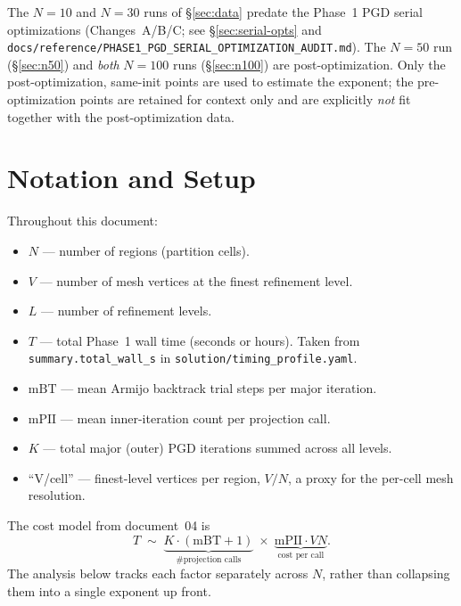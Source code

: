 \documentclass[11pt,a4paper]{article}
\begin{document}
\begin{remark}
The $N=10$ and $N=30$ runs of \S\ref{sec:data} predate the Phase~1 PGD serial
optimizations (Changes~A/B/C; see \S\ref{sec:serial-opts} and
\texttt{docs/reference/PHASE1\_PGD\_SERIAL\_OPTIMIZATION\_AUDIT.md}).  The
$N=50$ run (\S\ref{sec:n50}) and \emph{both} $N=100$ runs (\S\ref{sec:n100})
are post-optimization.  Only the post-optimization, same-init points are used
to estimate the exponent; the pre-optimization points are retained for context
only and are explicitly \emph{not} fit together with the post-optimization
data.
\end{remark}

\section{Notation and Setup}
\label{sec:notation}

Throughout this document:

\begin{itemize}
  \item $N$ --- number of regions (partition cells).
  \item $V$ --- number of mesh vertices at the finest refinement level.
  \item $L$ --- number of refinement levels.
  \item $T$ --- total Phase~1 wall time (seconds or hours).  Taken from
    \texttt{summary.total\_wall\_s} in \texttt{solution/timing\_profile.yaml}.
  \item $\mathrm{mBT}$ --- mean Armijo backtrack trial steps per major iteration.
  \item $\mathrm{mPII}$ --- mean inner-iteration count per projection call.
  \item $K$ --- total major (outer) PGD iterations summed across all levels.
  \item ``V/cell'' --- finest-level vertices per region, $V/N$, a proxy for the
    per-cell mesh resolution.
\end{itemize}

The cost model from document~04 is
\begin{equation}
  T \;\sim\;
  \underbrace{K \cdot (\mathrm{mBT}+1)}_{\text{\# projection calls}}
  \;\times\;
  \underbrace{\mathrm{mPII} \cdot V N}_{\text{cost per call}}.
  \label{eq:cost-model}
\end{equation}
The analysis below tracks each factor separately across $N$, rather than
collapsing them into a single exponent up front.
\end{document}
